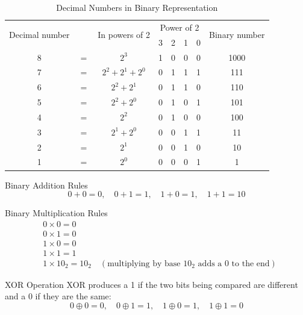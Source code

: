 \begin{table}[!ht]
\centering
\renewcommand{\arraystretch}{1.4}
\begin{tabular}{|c c c c c c c c|}
\hline 
\multirow{2}{*}{Decimal number} & & \multirow{2}{*}{In powers of 2} & \multicolumn{4}{c}{Power of 2} & \multirow{2}{*}{Binary number} \\
& & & 3 & 2 & 1 & 0 & \\ \hline
8 & $=$ & $2^3$ & 1 & 0 & 0 & 0 & 1000 \\
7 & $=$ & $2^2 + 2^1 + 2^0$ & 0 & 1 & 1 & 1 & 111 \\
6 & $=$ & $2^2 + 2^1$ & 0 & 1 & 1 & 0 & 110 \\
5 & $=$ & $2^2 + 2^0$ & 0 & 1 & 0 & 1 & 101 \\
4 & $=$ & $2^2$ & 0 & 1 & 0 & 0 & 100 \\
3 & $=$ & $2^1 + 2^0$ & 0 & 0 & 1 & 1 & 11 \\
2 & $=$ & $2^1$ & 0 & 0 & 1 & 0 & 10 \\
1 & $=$ & $2^0$ & 0 & 0 & 0 & 1 & 1 \\ \hline
\end{tabular}
\caption{Decimal Numbers in Binary Representation}
\end{table}

\begin{proposition}{Binary Addition Rules}
\[
0 + 0 = 0, \quad 0 + 1 = 1, \quad 1 + 0 = 1, \quad 1 + 1 = 10
\]
\end{proposition}

\begin{proposition}{Binary Multiplication Rules}
\[
\begin{aligned}
& 0 \times 0=0 \\
& 0 \times 1=0 \\
& 1 \times 0=0 \\
& 1 \times 1=1 \\
& 1 \times 10_2 = 10_2 \quad \left( \text{multiplying by base } 10_2 \text{ adds a 0 to the end} \right)
\end{aligned}
\]
\end{proposition}

\begin{proposition}{XOR Operation}
XOR produces a 1 if the two bits being compared are different and a 0 if they are the same:
\[
0 \oplus 0 = 0, \quad 0 \oplus 1 = 1, \quad 1 \oplus 0 = 1, \quad 1 \oplus 1 = 0
\]
\end{proposition}

